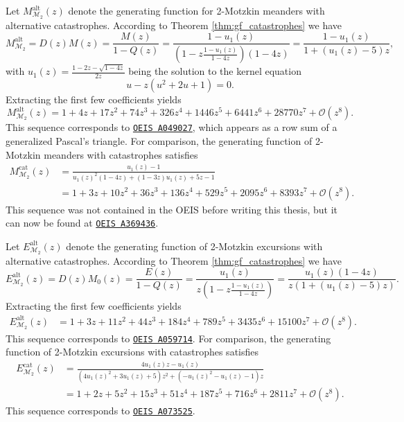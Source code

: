 \begin{example}
  Let $M_{\mathcal{M}_2}^\mathrm{alt}(z)$ denote the generating function for 2-Motzkin meanders with alternative catastrophes.
  According to Theorem \ref{thm:gf_catastrophes} we have 
  $$
    M_{\mathcal{M}_2}^\mathrm{alt} = D(z)M(z) = \frac{M(z)}{1 - Q(z)} = \frac{1 - u_1(z)}{\left(1 - z\frac{1 - u_1(z)}{1 - 4z}\right)(1 - 4z)} = \frac{1 - u_{1}(z)}{1 + (u_{1}(z) - 5)z},
  $$
  with $u_1(z) = \frac{1 - 2z - \sqrt{1-4z}}{2z}$ being the solution to 
  the kernel equation 
  $$
  u - z(u^{2} + 2u + 1) = 0.
  $$
  Extracting the first few coefficients yields 
  $$ 
    M_{\mathcal{M}_2}^\mathrm{alt}(z) = 1 + 4z + 17z^{2} + 74z^{3} + 326z^{4} + 1446z^{5} + 6441z^{6} + 28770z^{7} + \mathcal{O}(z^{8}).
  $$
  This sequence corresponds to \href{https://oeis.org/A049027}{\texttt{OEIS A049027}}, which appears as a row sum of a generalized Pascal's triangle.
  For comparison, the generating function of 2-Motzkin meanders with catastrophes satisfies
  \begin{align*}
    M_{\mathcal{M}_2}^\mathrm{cat}(z) &= \frac{u_1(z) - 1}{u_1(z)^{2} \left(1 - 4z\right)+\left(1 - 3 z\right) u_1(z) + 5 z -1} \\
    &= 1 + 3z + 10z^2 + 36z^3 + 136z^4 + 529z^5 + 2095z^6 + 8393z^7 + \mathcal{O}(z^8).
  \end{align*}
  This sequence was not contained in the OEIS before writing this thesis, but it can now be found at \href{https://oeis.org/A369436}{\texttt{OEIS A369436}}.
\end{example}

\begin{example}
  Let $E_{\mathcal{M}_2}^\mathrm{alt}(z)$ denote the generating function of 2-Motzkin excursions with alternative catastrophes.
  According to Theorem \ref{thm:gf_catastrophes} we have 
  $$
    E_{\mathcal{M}_2}^\mathrm{alt}(z) = D(z)M_0(z) = \frac{E(z)}{1 - Q(z)} = \frac{u_1(z)}{z\left(1 - z\frac{1 - u_1(z)}{1 - 4z}\right)} = \frac{u_{1}(z)(1 - 4z)}{z(1 + (u_{1}(z) - 5)z)}.
  $$
  Extracting the first few coefficients yields
  \begin{align*}
    E_{\mathcal{M}_2}^\mathrm{alt}(z) &= 1 + 3z + 11z^{2} + 44z^{3} + 184z^{4} + 789z^{5} + 3435z^{6} + 15100z^{7} + \mathcal{O}(z^{8}).
  \end{align*}
  This sequence corresponds to \href{https://oeis.org/A059714}{\texttt{OEIS A059714}}.
  For comparison, the generating function of 2-Motzkin excursions with catastrophes satisfies
  \begin{align*}
    E_{\mathcal{M}_2}^\mathrm{cat}(z) &= \frac{4 u_1(z) z - u_1(z)}{\left(4 u_1(z)^{2}+3 u_1(z) +5\right) z^{2}+\left(-u_1(z)^{2}-u_1(z) -1\right) z} \\
    &= 1 + 2z + 5z^2 + 15z^3 + 51z^4 + 187z^5 + 716z^6 + 2811z^7 + \mathcal{O}(z^8).
  \end{align*}
  This sequence corresponds to \href{https://oeis.org/A073525}{\texttt{OEIS A073525}}.
\end{example}

